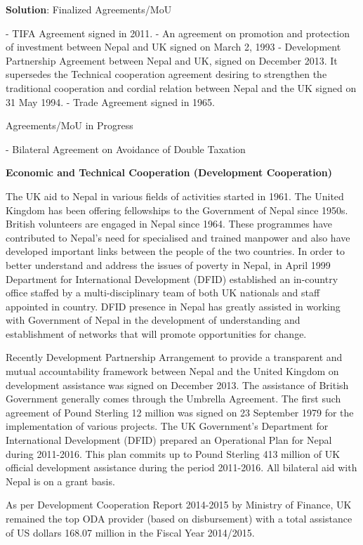 \documentclass[
  openany]{book}
\newenvironment{solution}{ {\bfseries Solution}:}{}
\begin{document}
\begin{questions}
\begin{solution}
Finalized Agreements/MoU

- TIFA Agreement signed in 2011.
- An agreement on promotion and protection of investment between Nepal and UK signed on March 2, 1993
- Development Partnership Agreement between Nepal and UK, signed on December 2013. It supersedes the Technical cooperation agreement desiring to strengthen the traditional cooperation and cordial relation between Nepal and the UK signed on 31 May 1994.
- Trade Agreement signed in 1965.

Agreements/MoU in Progress

- Bilateral Agreement on Avoidance of Double Taxation

\textbf{Economic and Technical Cooperation (Development Cooperation)}

The UK aid to Nepal in various fields of activities started in 1961. The United Kingdom has been offering fellowships to the Government of Nepal since 1950s. British volunteers are engaged in Nepal since 1964. These programmes have contributed to Nepal's need for specialised and trained manpower and also have developed important links between the people of the two countries. In order to better understand and address the issues of poverty in Nepal, in April 1999 Department for International Development (DFID) established an in-country office staffed by a multi-disciplinary team of both UK nationals and staff appointed in country. DFID presence in Nepal has greatly assisted in working with Government of Nepal in the development of understanding and establishment of networks that will promote opportunities for change.

Recently Development Partnership Arrangement to provide a transparent and mutual accountability framework between Nepal and the United Kingdom on development assistance was signed on December 2013. The assistance of British Government generally comes through the Umbrella Agreement. The first such agreement of Pound Sterling 12 million was signed on 23 September 1979 for the implementation of various projects. The UK Government’s Department for International Development (DFID) prepared an Operational Plan for Nepal during 2011-2016. This plan commits up to Pound Sterling 413 million of UK official development assistance during the period 2011-2016. All bilateral aid with Nepal is on a grant basis.

As per Development Cooperation Report 2014-2015 by Ministry of Finance, UK remained the top ODA provider (based on disbursement) with a total assistance of US dollars 168.07 million in the Fiscal Year 2014/2015.


\end{solution}
\end{questions}
\end{document}
